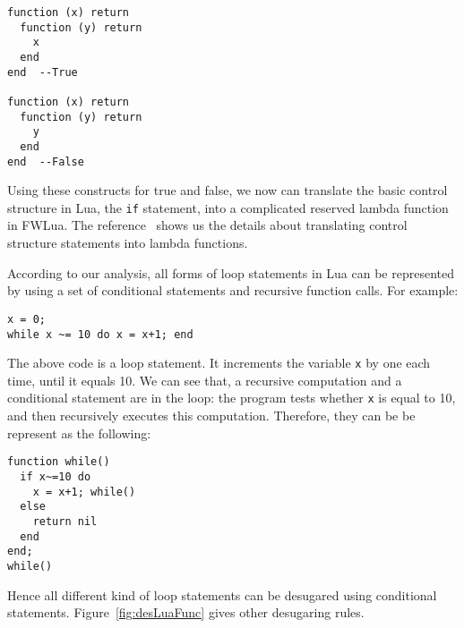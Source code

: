 \begin{verbatim}
function (x) return 
  function (y) return 
    x
  end
end  --True

function (x) return 
  function (y) return 
    y
  end
end  --False
\end{verbatim}

Using these constructs for true and false, we now can translate the basic control structure in Lua, the {\tt if} statement, into a complicated reserved lambda function in FWLua. The reference~\cite{TAPL} shows us the details about translating control structure statements into lambda functions.

According to our analysis, all forms of loop statements in Lua can be represented by using a set of conditional statements and recursive function calls. For example:

\begin{verbatim}
x = 0;
while x ~= 10 do x = x+1; end
\end{verbatim}

The above code is a loop statement. It increments the variable {\tt x} by one each time, until it equals 10. We can see that, a recursive computation and a conditional statement are in the loop: the program tests whether {\tt x} is equal to 10, and then recursively executes this computation. Therefore, they can be be represent as the following:

\begin{verbatim}
function while()
  if x~=10 do
    x = x+1; while()
  else
    return nil
  end
end;
while()
\end{verbatim}

Hence all different kind of loop statements can be desugared using conditional statements. Figure~\ref{fig:desLuaFunc} gives other desugaring rules.

